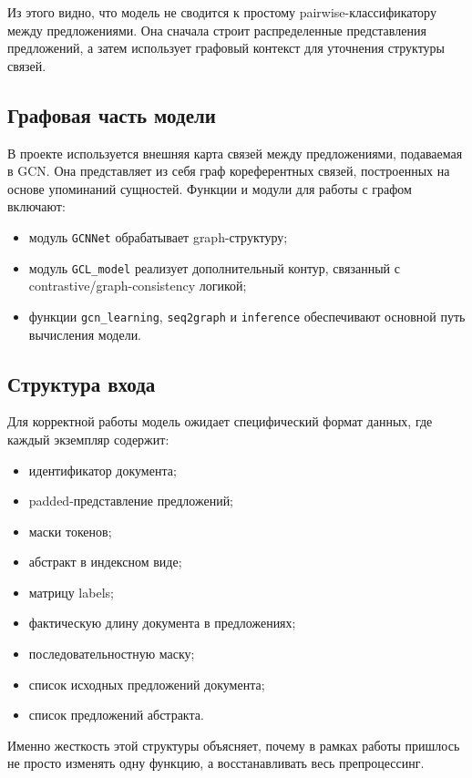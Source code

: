 \documentclass[12pt,a4paper]{article}
\begin{document}
Из этого видно, что модель не сводится к простому pairwise-классификатору между
предложениями. Она сначала строит распределенные представления предложений, а затем
использует графовый контекст для уточнения структуры связей.

\subsection{Графовая часть модели}

В проекте используется внешняя карта связей между предложениями, подаваемая в GCN. 
Она представляет из себя граф кореферентных связей, построенных на основе упоминаний сущностей.
Функции и модули для работы с графом включают:

\begin{itemize}
    \item модуль \texttt{GCNNet} обрабатывает graph-структуру;
    \item модуль \texttt{GCL\_model} реализует дополнительный контур, связанный с
    contrastive/graph-consistency логикой;
    \item функции \texttt{gcn\_learning}, \texttt{seq2graph} и \texttt{inference}
    обеспечивают основной путь вычисления модели.
\end{itemize}

\subsection{Структура входа}

Для корректной работы модель ожидает специфический формат данных, где каждый экземпляр
содержит:

\begin{itemize}
    \item идентификатор документа;
    \item padded-представление предложений;
    \item маски токенов;
    \item абстракт в индексном виде;
    \item матрицу labels;
    \item фактическую длину документа в предложениях;
    \item последовательностную маску;
    \item список исходных предложений документа;
    \item список предложений абстракта.
\end{itemize}

Именно жесткость этой структуры объясняет, почему в рамках работы пришлось не просто
изменять одну функцию, а восстанавливать весь препроцессинг.
\end{document}
